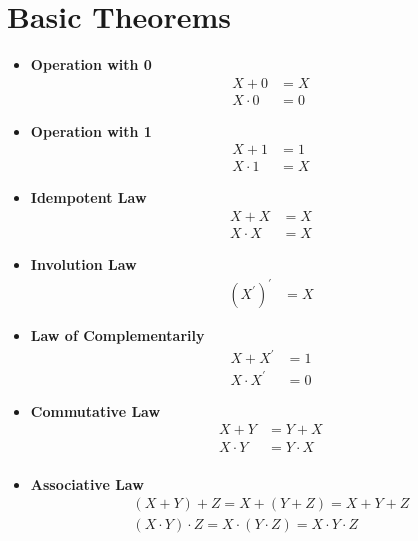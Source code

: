 \documentclass[oneside]{book}
\begin{document}
\section{Basic Theorems}
\begin{itemize}
	\item \textbf{Operation with 0}\\
	      \begin{align*}
		      X + 0    & = X \\
		      X\cdot 0 & = 0
	      \end{align*}
	\item \textbf{Operation with 1}\\
	      \begin{align*}
		      X + 1    & = 1 \\
		      X\cdot 1 & = X
	      \end{align*}
	\item \textbf{Idempotent Law}\\
	      \begin{align*}
		      X + X    & = X \\
		      X\cdot X & = X
	      \end{align*}
	\item \textbf{Involution Law}\\
	      \begin{align*}
		      (X^\prime)^\prime & = X
	      \end{align*}
	\item \textbf{Law of Complementarily}\\
	      \begin{align*}
		      X + X^\prime    & = 1 \\
		      X\cdot X^\prime & = 0
	      \end{align*}
	\item \textbf{Commutative Law}\\
	      \begin{align*}
		      X + Y    & = Y + X     \\
		      X\cdot Y & = Y \cdot X \\
	      \end{align*}
	\item \textbf{Associative Law}\\
	      \begin{align*}
		      (X + Y) + Z        = X + (Y + Z)          = X + Y + Z \\
		      (X\cdot Y)\cdot Z  = X \cdot (Y \cdot Z)  = X\cdot Y\cdot Z
	      \end{align*}

\end{itemize}
\end{document}
